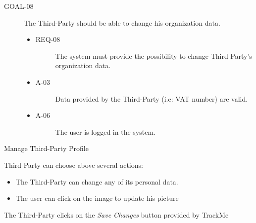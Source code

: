 \documentclass[a4paper]{article}
\newcommand{\requirement}{\ding{229}}%
\begin{document}
       \begin{description}
        	\item[GOAL-08] The Third-Party should be able to change his organization data. 
            	\begin{itemize}
            	    \item[\requirement]
                	\begin{description}
                	\item[REQ-08] The system must provide the possibility to change Third Party's organization data. 
                	\end{description}
                	\item
                	\begin{description}
                	\item[A-03] Data provided by the Third-Party (i.e: VAT number) are valid.
                	\end{description}
                	\item
                	\begin{description}
                	\item[A-06] The user is logged in the system.
                	\end{description}
                	\end{itemize}
        \end{description}
       
       \begin{usecase}{Manage Third-Party Profile}
        {Third Party can choose above several actions:\begin{itemize}
            \item The Third-Party can change any of its personal data.
            \item The user can click on the image to update his picture
        \end{itemize}}
        {The Third-Party clicks on the \textit{Save Changes} button provided by TrackMe}
       \end{usecase}
           
\end{document}
